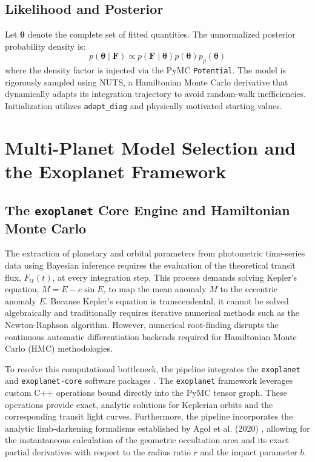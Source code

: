 \documentclass[12pt,a4paper,oneside]{report}
\newcommand{\code}[1]{\texttt{\small #1}}
\begin{document}
\section{Likelihood and Posterior}
Let \(\boldsymbol{\theta}\) denote the complete set of fitted quantities. The unnormalized posterior probability density is:
\begin{equation}
  p(\boldsymbol{\theta}\mid\boldsymbol{F}) \propto p(\boldsymbol{F}\mid\boldsymbol{\theta}) p(\boldsymbol{\theta}) p_{\rho}(\boldsymbol{\theta})
\end{equation}
where the density factor is injected via the PyMC \code{Potential}. The model is rigorously sampled using NUTS, a Hamiltonian Monte Carlo derivative that dynamically adapts its integration trajectory to avoid random-walk inefficiencies. Initialization utilizes \code{adapt\_diag} and physically motivated starting values.

\chapter{Multi-Planet Model Selection and the Exoplanet Framework}

\section{The \code{exoplanet} Core Engine and Hamiltonian Monte Carlo}
The extraction of planetary and orbital parameters from photometric time-series data using Bayesian inference requires the evaluation of the theoretical transit flux, $F_{\mathrm{tr}}(t)$, at every integration step. This process demands solving Kepler's equation, $M = E - e \sin E$, to map the mean anomaly $M$ to the eccentric anomaly $E$. Because Kepler's equation is transcendental, it cannot be solved algebraically and traditionally requires iterative numerical methods such as the Newton-Raphson algorithm. However, numerical root-finding disrupts the continuous automatic differentiation backends required for Hamiltonian Monte Carlo (HMC) methodologies.

To resolve this computational bottleneck, the pipeline integrates the \code{exoplanet} and \code{exoplanet-core} software packages \cite{foremanmackey2021}. The \code{exoplanet} framework leverages custom C++ operations bound directly into the PyMC tensor graph. These operations provide exact, analytic solutions for Keplerian orbits and the corresponding transit light curves. Furthermore, the pipeline incorporates the analytic limb-darkening formalisms established by Agol et al. (2020) \cite{agol2020}, allowing for the instantaneous calculation of the geometric occultation area and its exact partial derivatives with respect to the radius ratio $r$ and the impact parameter $b$. 
\end{document}
